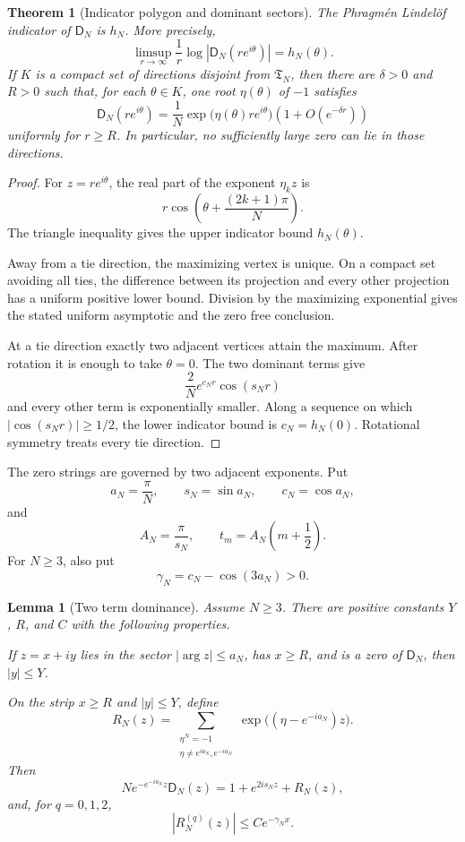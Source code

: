 \documentclass{aomart}
\newtheorem{theorem}{Theorem}[section]
\newtheorem{lemma}[lemma]{Lemma}
\theoremstyle{definition}
\theoremstyle{remark}
\newcommand{\Dfun}{\mathsf D}
\begin{document}
\begin{theorem}[Indicator polygon and dominant sectors]\label{thm:indicator_polygon}
The Phragm\'en Lindel\"of indicator of $\Dfun_N$ is $h_N$.  More precisely,
\[
\limsup_{r\to\infty}
\frac1r\log|\Dfun_N(re^{i\theta})|
=
h_N(\theta).
\]
If $K$ is a compact set of directions disjoint from $\mathfrak T_N$, then there are $\delta>0$ and $R>0$ such that, for each $\theta\in K$, one root $\eta(\theta)$ of $-1$ satisfies
\[
\Dfun_N(re^{i\theta})
=
\frac1N
\exp\bigl(\eta(\theta)re^{i\theta}\bigr)
\left(1+O(e^{-\delta r})\right)
\]
uniformly for $r\geq R$.  In particular, no sufficiently large zero can lie in those directions.
\end{theorem}

\begin{proof}
For $z=re^{i\theta}$, the real part of the exponent $\eta_kz$ is
\[
r\cos\left(\theta+\frac{(2k+1)\pi}{N}\right).
\]
The triangle inequality gives the upper indicator bound $h_N(\theta)$.

Away from a tie direction, the maximizing vertex is unique.  On a compact set avoiding all ties, the difference between its projection and every other projection has a uniform positive lower bound.  Division by the maximizing exponential gives the stated uniform asymptotic and the zero free conclusion.

At a tie direction exactly two adjacent vertices attain the maximum.  After rotation it is enough to take $\theta=0$.  The two dominant terms give
\[
\frac2N e^{c_Nr}\cos(s_Nr)
\]
and every other term is exponentially smaller.  Along a sequence on which $|\cos(s_Nr)|\geq1/2$, the lower indicator bound is $c_N=h_N(0)$.  Rotational symmetry treats every tie direction.
\end{proof}

The zero strings are governed by two adjacent exponents.  Put
\[
a_N=\frac\pi N,
\qquad
s_N=\sin a_N,
\qquad
c_N=\cos a_N,
\]
and
\[
A_N=\frac\pi{s_N},
\qquad
 t_m=A_N\left(m+\frac12\right).
\]
For $N\geq3$, also put
\[
\gamma_N=c_N-\cos(3a_N)>0.
\]

\begin{lemma}[Two term dominance]\label{lem:two_term_dominance}
Assume $N\geq3$.  There are positive constants $Y$, $R$, and $C$ with the following properties.

If $z=x+iy$ lies in the sector $|\arg z|\leq a_N$, has $x\geq R$, and is a zero of $\Dfun_N$, then $|y|\leq Y$.

On the strip $x\geq R$ and $|y|\leq Y$, define
\[
R_N(z)
=
\sum_{\substack{\eta^N=-1\\
\eta\ne e^{ia_N},e^{-ia_N}}}
\exp\bigl((\eta-e^{-ia_N})z\bigr).
\]
Then
\[
N e^{-e^{-ia_N}z}\Dfun_N(z)
=
1+e^{2is_Nz}+R_N(z),
\]
and, for $q=0,1,2$,
\[
|R_N^{(q)}(z)|
\leq
C e^{-\gamma_Nx}.
\]
\end{lemma}
\end{document}
